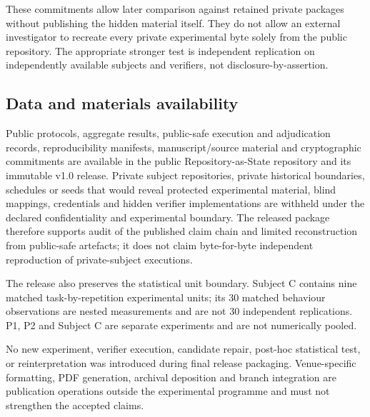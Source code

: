 These commitments allow later comparison against retained private packages without publishing the hidden material itself. They do not allow an external investigator to recreate every private experimental byte solely from the public repository. The appropriate stronger test is independent replication on independently available subjects and verifiers, not disclosure-by-assertion.

\subsection*{Data and materials availability}

Public protocols, aggregate results, public-safe execution and adjudication records, reproducibility manifests, manuscript/source material and cryptographic commitments are available in the public Repository-as-State repository and its immutable v1.0 release. Private subject repositories, private historical boundaries, schedules or seeds that would reveal protected experimental material, blind mappings, credentials and hidden verifier implementations are withheld under the declared confidentiality and experimental boundary. The released package therefore supports audit of the published claim chain and limited reconstruction from public-safe artefacts; it does not claim byte-for-byte independent reproduction of private-subject executions.

The release also preserves the statistical unit boundary. Subject C contains nine matched task-by-repetition experimental units; its 30 matched behaviour observations are nested measurements and are not 30 independent replications. P1, P2 and Subject C are separate experiments and are not numerically pooled.

No new experiment, verifier execution, candidate repair, post-hoc statistical test, or reinterpretation was introduced during final release packaging. Venue-specific formatting, PDF generation, archival deposition and branch integration are publication operations outside the experimental programme and must not strengthen the accepted claims.
